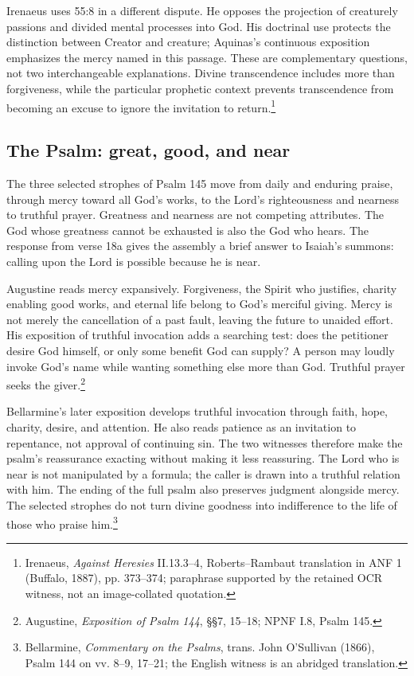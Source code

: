 Irenaeus uses 55:8 in a different dispute. He opposes the projection of creaturely passions and divided mental processes into God. His doctrinal use protects the distinction between Creator and creature; Aquinas's continuous exposition emphasizes the mercy named in this passage. These are complementary questions, not two interchangeable explanations. Divine transcendence includes more than forgiveness, while the particular prophetic context prevents transcendence from becoming an excuse to ignore the invitation to return.\footnote{Irenaeus, \textit{Against Heresies} II.13.3--4, Roberts--Rambaut translation in ANF 1 (Buffalo, 1887), pp. 373--374; paraphrase supported by the retained OCR witness, not an image-collated quotation.}

\subsection{The Psalm: great, good, and near}
The three selected strophes of Psalm 145 move from daily and enduring praise, through mercy toward all God's works, to the Lord's righteousness and nearness to truthful prayer. Greatness and nearness are not competing attributes. The God whose greatness cannot be exhausted is also the God who hears. The response from verse 18a gives the assembly a brief answer to Isaiah's summons: calling upon the Lord is possible because he is near.

Augustine reads mercy expansively. Forgiveness, the Spirit who justifies, charity enabling good works, and eternal life belong to God's merciful giving. Mercy is not merely the cancellation of a past fault, leaving the future to unaided effort. His exposition of truthful invocation adds a searching test: does the petitioner desire God himself, or only some benefit God can supply? A person may loudly invoke God's name while wanting something else more than God. Truthful prayer seeks the giver.\footnote{Augustine, \textit{Exposition of Psalm 144}, §§7, 15--18; NPNF I.8, Psalm 145.}

Bellarmine's later exposition develops truthful invocation through faith, hope, charity, desire, and attention. He also reads patience as an invitation to repentance, not approval of continuing sin. The two witnesses therefore make the psalm's reassurance exacting without making it less reassuring. The Lord who is near is not manipulated by a formula; the caller is drawn into a truthful relation with him. The ending of the full psalm also preserves judgment alongside mercy. The selected strophes do not turn divine goodness into indifference to the life of those who praise him.\footnote{Bellarmine, \textit{Commentary on the Psalms}, trans. John O'Sullivan (1866), Psalm 144 on vv. 8--9, 17--21; the English witness is an abridged translation.}

